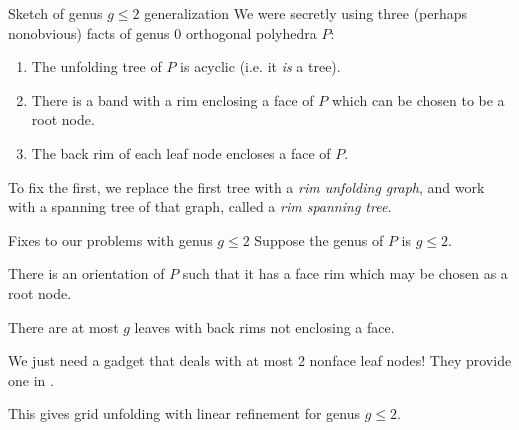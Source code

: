 \documentclass[handout]{beamer}
\theoremstyle{plain}
\begin{document}
\begin{frame}{Sketch of genus $g \leq 2$ generalization}
  We were secretly using three (perhaps nonobvious) facts of genus 0 orthogonal polyhedra $P$:
  \begin{enumerate}
    \pause \item The unfolding tree of $P$ is acyclic (i.e. it \emph{is} a tree).
    \pause \item There is a band with a rim enclosing a face of $P$ which can be chosen to be a root node.
    \pause \item The back rim of each leaf node encloses a face of $P$.
  \end{enumerate}
  \pause To fix the first, we replace the first tree with a \emph{rim unfolding graph}, and work with a spanning tree of that graph, called a \emph{rim spanning tree.}
\end{frame}

\begin{frame}{Fixes to our problems with genus $g \leq 2$}
  Suppose the genus of $P$ is $g \leq 2$.
  \pause 
  \begin{lemma}
    There is an orientation of $P$ such that it has a face rim which may be chosen as a root node.
  \end{lemma}
  \pause
  \begin{lemma}
    There are at most $g$ leaves with back rims not enclosing a face. 
  \end{lemma}
  \pause We just need a gadget that deals with at most 2 nonface leaf nodes!
  They provide one in .

  This gives grid unfolding with linear refinement for genus $g \leq 2$.
\end{frame}
\end{document}
